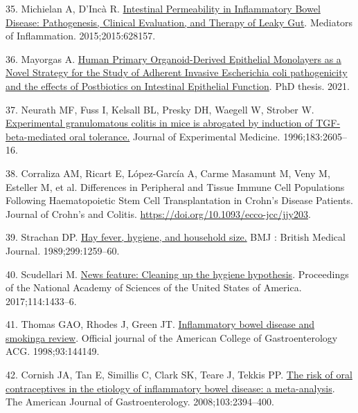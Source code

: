 \documentclass[
  12pt,
  a4paper,
  twoside,
  openright]{book}
\newlength{\cslhangindent}
\newlength{\cslentryspacingunit} %
\newenvironment{CSLReferences}[2] %
 {%
  \setlength{\parindent}{0pt}
  \ifodd #1
  \let\oldpar\par
  \def\par{\hangindent=\cslhangindent\oldpar}
  \fi
  \setlength{\parskip}{#2\cslentryspacingunit}
 }%
 {}
\begin{document}
\begin{CSLReferences}{0}{0}
\leavevmode{}%
35. Michielan A, D'Incà R. \href{https://doi.org/10.1155/2015/628157}{Intestinal Permeability in Inflammatory Bowel Disease: Pathogenesis, Clinical Evaluation, and Therapy of Leaky Gut}. Mediators of Inflammation. 2015;2015:628157.

\leavevmode{}%
36. Mayorgas A. \href{http://www.tdx.cat/handle/10803/672414}{Human Primary Organoid-Derived Epithelial Monolayers as a Novel Strategy for the Study of Adherent Invasive Escherichia coli pathogenicity and the effects of Postbiotics on Intestinal Epithelial Function}. PhD thesis. 2021.

\leavevmode{}%
37. Neurath MF, Fuss I, Kelsall BL, Presky DH, Waegell W, Strober W. \href{https://doi.org/10.1084/jem.183.6.2605}{Experimental granulomatous colitis in mice is abrogated by induction of TGF-beta-mediated oral tolerance.} Journal of Experimental Medicine. 1996;183:2605--16.

\leavevmode{}%
38. Corraliza AM, Ricart E, López-García A, Carme Masamunt M, Veny M, Esteller M, et al. Differences in Peripheral and Tissue Immune Cell Populations Following Haematopoietic Stem Cell Transplantation in Crohn{'}s Disease Patients. Journal of Crohn's and Colitis. \url{https://doi.org/10.1093/ecco-jcc/jjy203}.

\leavevmode{}%
39. Strachan DP. \href{https://www.ncbi.nlm.nih.gov/pmc/articles/PMC1838109/}{Hay fever, hygiene, and household size.} BMJ : British Medical Journal. 1989;299:1259--60.

\leavevmode{}%
40. Scudellari M. \href{https://doi.org/10.1073/pnas.1700688114}{News feature: Cleaning up the hygiene hypothesis}. Proceedings of the National Academy of Sciences of the United States of America. 2017;114:1433--6.

\leavevmode{}%
41. Thomas GAO, Rhodes J, Green JT. \href{https://doi.org/10.1111/j.1572-0241.1998.00144.x}{Inflammatory bowel disease and smoking{\textemdash}a review}. Official journal of the American College of Gastroenterology \textbar{} ACG. 1998;93:144149.

\leavevmode{}%
42. Cornish JA, Tan E, Simillis C, Clark SK, Teare J, Tekkis PP. \href{https://doi.org/10.1111/j.1572-0241.2008.02064.x}{The risk of oral contraceptives in the etiology of inflammatory bowel disease: a meta-analysis}. The American Journal of Gastroenterology. 2008;103:2394--400.


\end{CSLReferences}
\end{document}

